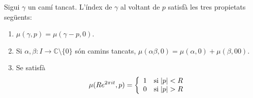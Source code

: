 \documentclass[../main.tex]{subfiles}
\begin{document}
\begin{prop}
\label{prop:propietatsindex} Sigui $\gamma$ un camí tancat. L'índex de $\gamma$ al voltant de $p$ satisfà les tres propietats següents:
\begin{enumerate}[(1)]
    \item $\mu(\gamma,p) = \mu(\gamma-p,0)$.
    \item Si $\alpha,\beta:I\rightarrow \mathbb{C}\setminus\{0\}$ són camins tancats, $\mu(\alpha\beta,0) = \mu(\alpha,0)+\mu(\beta,00)$.
    \item Se satisfà
    \begin{equation}
        \notag
        \mu(Re^{2\pi it},p) = \left\{
        \begin{array}{ll}
            1 & \mathrm{si}\;|p|<R \\
            0 & \mathrm{si}\;|p|>R
        \end{array}
        \right.
    \end{equation}
\end{enumerate}
\end{prop}
\end{document}
